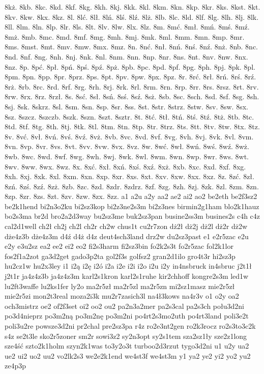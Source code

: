 {8kż.
8kb.
8kc.
8kd.
8kf.
8kg.
8kh.
8kj.
8kk.
8kl.
8km.
8kn.
8kp.
8kr.
8ks.
8kst.
8kt.
8kv.
8kw.
8kx.
8kz.
8l.
8lć.
8lł.
8lń.
8lś.
8lź.
8lż.
8lb.
8lc.
8ld.
8lf.
8lg.
8lh.
8lj.
8lk.
8ll.
8lm.
8ln.
8lp.
8lr.
8ls.
8lt.
8lv.
8lw.
8lx.
8lz.
8m.
8mć.
8mł.
8mń.
8mś.
8mź.
8mż.
8mb.
8mc.
8md.
8mf.
8mg.
8mh.
8mj.
8mk.
8ml.
8mm.
8mn.
8mp.
8mr.
8ms.
8mst.
8mt.
8mv.
8mw.
8mx.
8mz.
8n.
8nć.
8nł.
8nń.
8nś.
8nź.
8nż.
8nb.
8nc.
8nd.
8nf.
8ng.
8nh.
8nj.
8nk.
8nl.
8nm.
8nn.
8np.
8nr.
8ns.
8nt.
8nv.
8nw.
8nx.
8nz.
8p.
8pć.
8pł.
8pń.
8pś.
8pź.
8pż.
8pb.
8pc.
8pd.
8pf.
8pg.
8ph.
8pj.
8pk.
8pl.
8pm.
8pn.
8pp.
8pr.
8prz.
8ps.
8pt.
8pv.
8pw.
8px.
8pz.
8r.
8rć.
8rł.
8rń.
8rś.
8rź.
8rż.
8rb.
8rc.
8rd.
8rf.
8rg.
8rh.
8rj.
8rk.
8rl.
8rm.
8rn.
8rp.
8rr.
8rs.
8rsz.
8rt.
8rv.
8rw.
8rx.
8rz.
8rzł.
8s.
8sć.
8sł.
8sń.
8sś.
8sź.
8sż.
8sb.
8sc.
8sch.
8sd.
8sf.
8sg.
8sh.
8sj.
8sk.
8skrz.
8sl.
8sm.
8sn.
8sp.
8sr.
8ss.
8st.
8str.
8strz.
8stw.
8sv.
8sw.
8sx.
8sz.
8szcz.
8szczb.
8szk.
8szn.
8szt.
8sztr.
8t.
8tć.
8tł.
8tń.
8tś.
8tź.
8tż.
8tb.
8tc.
8td.
8tf.
8tg.
8th.
8tj.
8tk.
8tl.
8tm.
8tn.
8tp.
8tr.
8trz.
8ts.
8tt.
8tv.
8tw.
8tx.
8tz.
8v.
8vć.
8vł.
8vń.
8vś.
8vź.
8vż.
8vb.
8vc.
8vd.
8vf.
8vg.
8vh.
8vj.
8vk.
8vl.
8vm.
8vn.
8vp.
8vr.
8vs.
8vt.
8vv.
8vw.
8vx.
8vz.
8w.
8wć.
8wł.
8wń.
8wś.
8wź.
8wż.
8wb.
8wc.
8wd.
8wf.
8wg.
8wh.
8wj.
8wk.
8wl.
8wm.
8wn.
8wp.
8wr.
8ws.
8wt.
8wv.
8ww.
8wx.
8wz.
8x.
8xć.
8xł.
8xń.
8xś.
8xź.
8xż.
8xb.
8xc.
8xd.
8xf.
8xg.
8xh.
8xj.
8xk.
8xl.
8xm.
8xn.
8xp.
8xr.
8xs.
8xt.
8xv.
8xw.
8xx.
8xz.
8z.
8zć.
8zł.
8zń.
8zś.
8zź.
8zż.
8zb.
8zc.
8zd.
8zdr.
8zdrz.
8zf.
8zg.
8zh.
8zj.
8zk.
8zl.
8zm.
8zn.
8zp.
8zr.
8zs.
8zt.
8zv.
8zw.
8zx.
8zz.
a1
a2u
a2y
aa2
ae2
ai2
ao2
be2eth
be2f3sz2
be2k1hend
bi2n3o2ku
bi2sz3kop
bi2z3ne2s3m
bi2z3nes
birmin2g1ham
blo2k1hauz
bo2s3ma
br2d
bro2a2d3way
bu2sz3me
buk2sz3pan
busine2ss3m
busines2s
c4h
c4z
cal2d1well
ch2ł
ch2j
ch2l
ch2r
ch2w
chus1t
cu2r7zon
dż2ł
dż2j
dż2l
dż2r
dż2w
dże4z3b
dże4z3m
d4ź
d4ż
d4z
deut4sch3land
drz2w
du2sz3past
e1
e2r5zac
e2u
e2y
e3u2sz
ea2
ee2
ei2
eo2
fi2s3harm
fi2sz3bin
fo2k2s3t
fo2r5zac
fol2k1lor
fos2f1a2zot
ga3d2get
gado3p2ta
gol2f3s
golfsz2
gran2d1ilo
gro4t3r
hi2sz3p
hu2cz1w
hu2x3ley
i1
i2ą
i2ę
i2ó
i2a
i2e
i2i
i2o
i2u
i2y
in4nsbruck
in4sbruc
j2t1ł
j2t1r
ja4z4z3b
ja4z4z3m
karl2s1kron
karl2s1ruhe
kir2chhoff
kongre2s3m
led1w
lu2ft3waffe
lu2ks1fer
ly2o
ma2r5zł
ma2r5zl
ma2r5zn
mi2sz1masz
mie2r5zł
mie2r5zi
mon2t3real
moza2i3k
mu2r7zasich3l
na4ł3kows
na4r3v
o1
o2y
oa2
och3mistrz
oe2
of2f3set
oi2
oo2
ou2
pa2n3a2mer
pa2s3cal
pa2s3ch
połu3d2ni
po3d4nieprz
po3m2ną
po3m2nę
po3m2ni
po4rt2s3mo2uth
po4rt3land
poli3e2t
poli3u2re
powsze3d2ni
pr2chal
pre2sz3pa
r4z
ro2e3nt2gen
ro2k3rocz
ro2s3to3c2k
s4z
se2t3le
sko2r5zoner
sm2r
sowi3z2
sy2n3opt
sy2s1tem
sza2sz1ły
sze2z1long
sze4ść
szto2k1holm
szyn2k1was
to3y2o3t
turboo2d3rzut
tygo3d2ni
u1
u2y
ua2
ue2
ui2
uo2
uu2
vo2lk2s3
we2e2k1end
we4st3f
we4st3m
y1
ya2
ye2
yi2
yo2
yu2
ze4p3p
}


